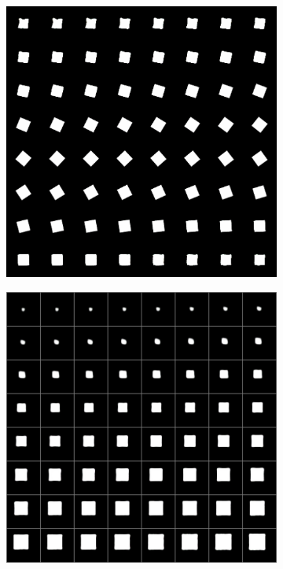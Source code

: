 \documentclass[10pt,a4paper]{article}
\begin{document}
\begin{figure}[!ht]
\centering
\begin{subfigure}{0.49\textwidth}
	\centering
	\includegraphics[width=\textwidth] {square_interpolation_theta.png}
	\caption{}
	\label{fig1:subim1}
\end{subfigure}
\begin{subfigure}{0.49\textwidth}
	\centering	
	\includegraphics[width=\textwidth]{square_interpolation_x.png}

\end{subfigure}
\end{figure}
\end{document}
